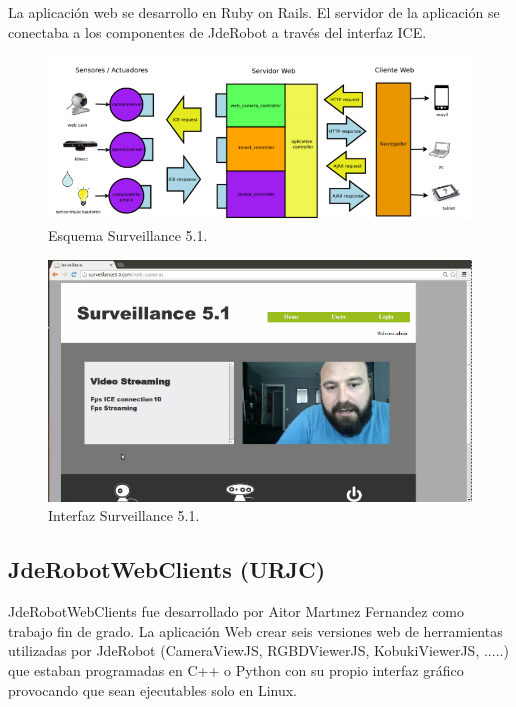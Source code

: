La aplicación web se desarrollo en Ruby on Rails. El servidor de la aplicación se conectaba a los componentes de JdeRobot a través del interfaz ICE.
\begin{figure}[!h]
\centering
\includegraphics[width=0.5\linewidth]{Figures/edgar_surveillance_esquema}
\decoRule
\caption[Esquema Surveillance 5.1]{Esquema Surveillance 5.1.}
\label{fig:edgar_surveillance_esquema}
\end{figure}
\begin{figure}[!h]
\centering
\includegraphics[width=0.5\linewidth]{Figures/edgar_surveillance5_web}
\decoRule
\caption[Interfaz Surveillance 5.1.]{Interfaz Surveillance 5.1.}
\label{fig:edgar_surveillance5_web}
\end{figure}
\subsection*{JdeRobotWebClients (URJC)}
JdeRobotWebClients \cite{TFGJdeRobotWebClients}\cite{JdeRobotWebClients} fue desarrollado por Aitor Martınez Fernandez como trabajo fin de grado. La aplicación Web crear seis versiones web de herramientas utilizadas por  JdeRobot (CameraViewJS, RGBDViewerJS, KobukiViewerJS, .....) que estaban programadas en C++ o Python con su propio interfaz gráfico provocando que sean ejecutables solo en Linux. 

